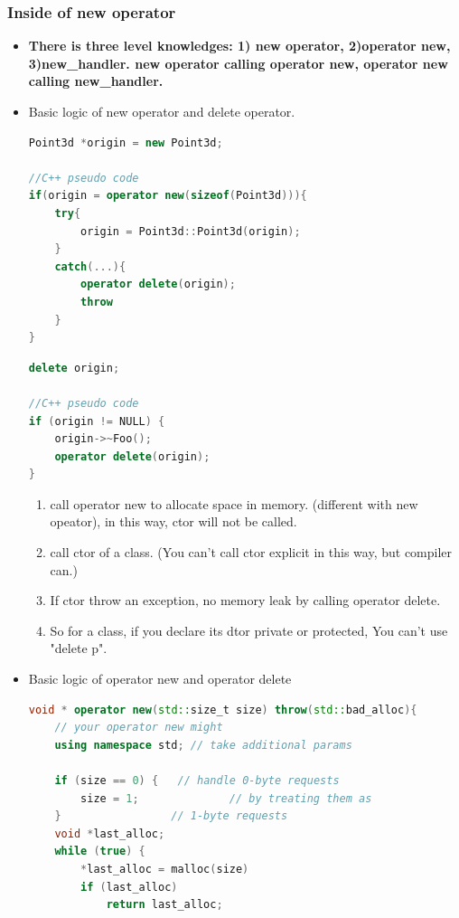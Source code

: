 \documentclass[a4paper,12pt,twoside]{book}
\begin{document}
\subsubsection{Inside of new operator}
\begin{itemize}
	\item \textbf{There is three level knowledges: 1) new operator, 2)operator new, 3)new\_handler. new operator calling operator new, operator new calling new\_handler.} 
	
	\item Basic logic of new operator and delete operator.
\begin{lstlisting}[frame=single, language=c++]
Point3d *origin = new Point3d;
	
//C++ pseudo code
if(origin = operator new(sizeof(Point3d))){
	try{
		origin = Point3d::Point3d(origin);
	}
	catch(...){
		operator delete(origin);
		throw
	}
}
	\end{lstlisting}
	
\begin{lstlisting}[frame=single, language=c++]
delete origin;
	
//C++ pseudo code
if (origin != NULL) {
	origin->~Foo();
	operator delete(origin);
}
\end{lstlisting}
	
	\begin{enumerate}
		\item call operator new to allocate space in memory. (different with new opeator), in this way, ctor will not be called.
		\item call ctor of a class. (You can't call ctor explicit in this way, but compiler can.)
		\item If ctor throw an exception, no memory leak by calling operator delete.
		
		\item So for a class, if you declare its dtor private or protected, You can't use "delete p".
	\end{enumerate}
	
	
	\item Basic logic of operator new and operator delete
\begin{lstlisting}[frame=single, language=c++]
void * operator new(std::size_t size) throw(std::bad_alloc){
	// your operator new might
	using namespace std; // take additional params
		
	if (size == 0) {   // handle 0-byte requests
		size = 1;              // by treating them as
	}                 // 1-byte requests
	void *last_alloc;
	while (true) {
		*last_alloc = malloc(size)
		if (last_alloc)
			return last_alloc;
		

\end{lstlisting}
\end{itemize}
\end{document}
